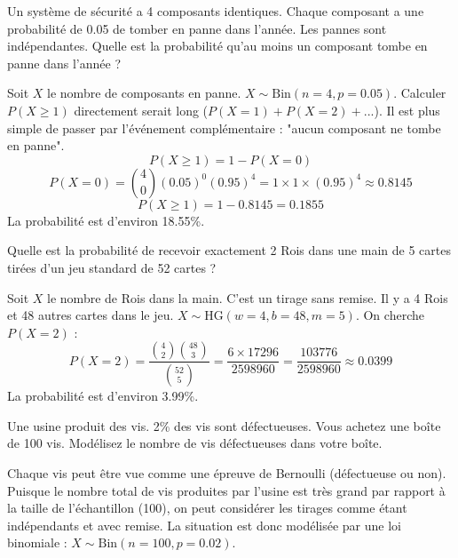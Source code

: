 \begin{exercicebox}
Un système de sécurité a 4 composants identiques. Chaque composant a une probabilité de 0.05 de tomber en panne dans l'année. Les pannes sont indépendantes. Quelle est la probabilité qu'au moins un composant tombe en panne dans l'année ?
\end{exercicebox}

\begin{correctionbox}
Soit $X$ le nombre de composants en panne. $X \sim \text{Bin}(n=4, p=0.05)$.
Calculer $P(X \ge 1)$ directement serait long ($P(X=1)+P(X=2)+...$). Il est plus simple de passer par l'événement complémentaire : "aucun composant ne tombe en panne".
$$ P(X \ge 1) = 1 - P(X=0) $$
$$ P(X=0) = \binom{4}{0} (0.05)^0 (0.95)^4 = 1 \times 1 \times (0.95)^4 \approx 0.8145 $$
$$ P(X \ge 1) = 1 - 0.8145 = 0.1855 $$
La probabilité est d'environ 18.55\%.
\end{correctionbox}

\begin{exercicebox}
Quelle est la probabilité de recevoir exactement 2 Rois dans une main de 5 cartes tirées d'un jeu standard de 52 cartes ?
\end{exercicebox}

\begin{correctionbox}
Soit $X$ le nombre de Rois dans la main. C'est un tirage sans remise. Il y a 4 Rois et 48 autres cartes dans le jeu. $X \sim \text{HG}(w=4, b=48, m=5)$.
On cherche $P(X=2)$ :
$$ P(X=2) = \frac{\binom{4}{2} \binom{48}{3}}{\binom{52}{5}} = \frac{6 \times 17296}{2598960} = \frac{103776}{2598960} \approx 0.0399 $$
La probabilité est d'environ 3.99\%.
\end{correctionbox}

\begin{exercicebox}
Une usine produit des vis. 2\% des vis sont défectueuses. Vous achetez une boîte de 100 vis. Modélisez le nombre de vis défectueuses dans votre boîte.
\end{exercicebox}

\begin{correctionbox}
Chaque vis peut être vue comme une épreuve de Bernoulli (défectueuse ou non). Puisque le nombre total de vis produites par l'usine est très grand par rapport à la taille de l'échantillon (100), on peut considérer les tirages comme étant indépendants et avec remise. La situation est donc modélisée par une loi binomiale : $X \sim \text{Bin}(n=100, p=0.02)$.
\end{correctionbox}

